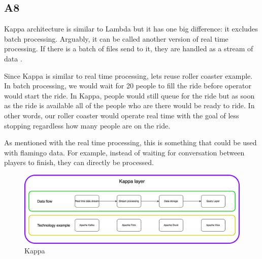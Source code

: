 \subsection{A8}\label{A8}

Kappa architecture is similar to Lambda but it has one big difference: it excludes batch processing. Arguably, it can be called another version of real time processing. If there is a batch of files send to it, they are handled as a stream of data \parencite{feick2018fundamentals}.

Since Kappa is similar to real time processing, lets reuse roller coaster example. In batch processing, we would wait for 20 people to fill the ride before operator would start the ride. In Kappa, people would still queue for the ride but as soon as the ride is available all of the people who are there would be ready to ride. In other words, our roller coaster would operate real time with the goal of less stopping regardless how many people are on the ride.

As mentioned with the real time processing, this is something that could be used with flamingo data. For example, instead of waiting for conversation between players to finish, they can directly be processed.

\begin{figure}[H]
\includegraphics[scale=0.35]{img/ProcessingParadigms/BigData-Kappa.png}
\centering
\caption{Kappa}
\label{fig:Kappa}
\end{figure}